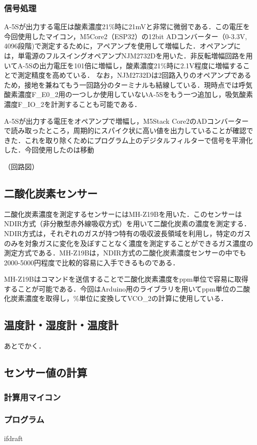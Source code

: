 \subsubsection{信号処理}

A-5Sが出力する電圧は酸素濃度21\%時に21mVと非常に微弱である．この電圧を今回使用したマイコン，M5Core2（ESP32）の12bit ADコンバーター（0-3.3V, 4096段階)で測定するために，アペアンプを使用して増幅した．オペアンプには，単電源のフルスイングオペアンプNJM2732Dを用いた．非反転増幅回路を用いてA-5Sの出力電圧を101倍に増幅し，酸素濃度21\%時に2.1V程度に増幅することで測定精度を高めている．
なお，NJM2732Dは2回路入りのオペアンプであるため，接地を兼ねてもう一回路分のターミナルも結線している．現時点では呼気酸素濃度F_E0_2用の一つしか使用していないA-5Sをもう一つ追加し，吸気酸素濃度F_IO_2を計測することも可能である．

A-5Sが出力する電圧をオペアンプで増幅し，M5Stack Core2のADコンバーターで読み取ったところ，周期的にスパイク状に高い値を出力していることが確認できた．これを取り除くためにプログラム上のデジタルフィルターで信号を平滑化した．今回使用したのは移動

（回路図）

\subsection{二酸化炭素センサー}

二酸化炭素濃度を測定するセンサーにはMH-Z19Bを用いた．このセンサーはNDIR方式（非分散型赤外線吸収方式）を用いて二酸化炭素の濃度を測定する．NDIR方式は，それぞれのガスが持つ特有の吸収波長領域を利用し，特定のガスのみを対象ガスに変化を及ぼすことなく濃度を測定することができるガス濃度の測定方式である\cite{whats_ndir}．MH-Z19Bは，NDIR方式の二酸化炭素濃度センサーの中でも2000-5000円程度で比較的容易に入手できるものである．

MH-Z19Bはコマンドを送信することで二酸化炭素濃度をppm単位で容易に取得することが可能である．今回はArduino用のライブラリを用いてppm単位の二酸化炭素濃度を取得し，\%単位に変換してVCO_2の計算に使用している．

\subsection{温度計・湿度計・温度計}

あとでかく．

\subsection{センサー値の計算}

\subsubsection{計算用マイコン}

\subsubsection{プログラム}

\expandafter\ifx\csname ifdraft\endcsname\relax
  
\fi
